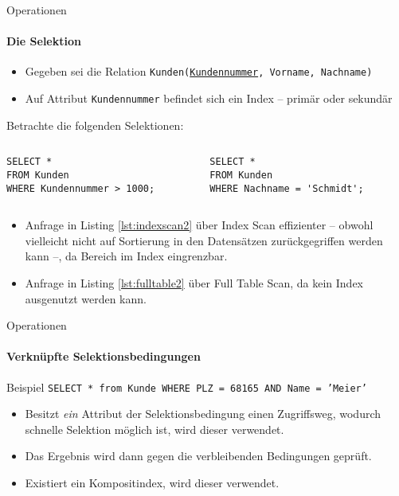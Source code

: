 \begin{frame}[fragile]{Operationen}
\framesubtitle{Die Selektion}
\begin{itemize}
	\item Gegeben sei die Relation \texttt{Kunden(\uline{Kundennummer}, Vorname, Nachname)}
	\item Auf Attribut \texttt{Kundennummer} befindet sich ein Index -- prim\"ar oder sekund\"ar
\end{itemize}
\abs
Betrachte die folgenden Selektionen:
\begin{columns}
\lstset{captionpos=b}
\begin{column}{.48\textwidth}
\begin{lstlisting}[caption=Selektion \"uber Index-Feld, xleftmargin=3ex, label=lst:indexscan2]
SELECT * 
FROM Kunden
WHERE Kundennummer > 1000;
\end{lstlisting}
\end{column}	
\begin{column}{.48\textwidth}
\begin{lstlisting}[caption=Selektion \"uber Nicht-Index-Feld, label=lst:fulltable2]
SELECT * 
FROM Kunden
WHERE Nachname = 'Schmidt'; 
\end{lstlisting}
\end{column}
\end{columns}
\begin{itemize}
	\item Anfrage in Listing \ref{lst:indexscan2} über Index Scan effizienter -- obwohl vielleicht nicht auf 
	Sortierung in den Datens\"atzen zurückgegriffen werden kann --, da Bereich im Index eingrenzbar. 
	\item Anfrage in Listing \ref{lst:fulltable2} \"uber Full Table Scan, da kein Index ausgenutzt werden kann.
\end{itemize}
\end{frame}

\begin{frame}[fragile]{Operationen}
\framesubtitle{Verknüpfte Selektionsbedingungen}
\begin{block}{Beispiel}
\texttt{SELECT * from Kunde WHERE PLZ = 68165 AND Name = 'Meier'}
\begin{itemize}
	\item Besitzt \textit{ein} Attribut der Selektionsbedingung einen Zugriffsweg, wodurch schnelle 
	Selektion möglich ist, wird dieser verwendet.
	\item Das Ergebnis wird dann gegen die verbleibenden Bedingungen geprüft. 
	\item Existiert ein Kompositindex, wird dieser verwendet.
\end{itemize}
\end{block}
\end{frame}

